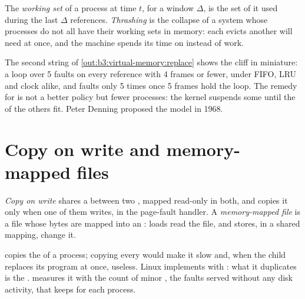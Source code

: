 \begin{definition}\label{def:b3:virtual-memory:working-set}
The \emph{working set} of a process at time $t$, for a window $\Delta$, is the set of  it used during the last $\Delta$ references. \emph{Thrashing} is the collapse of a system whose processes do not all have their working sets in memory: each evicts  another will need at once, and the machine spends its time on  instead of work.
\end{definition}

The second string of \cref{out:b3:virtual-memory:replace} shows the cliff in miniature: a loop over 5  faults on every reference with 4 frames or fewer, under FIFO, LRU and clock alike, and faults only 5 times once 5 frames hold the loop. The remedy for  is not a better policy but fewer processes: the kernel suspends some until the  of the others fit. Peter Denning proposed the  model in 1968. %

\section{Copy on write and memory-mapped files}\label{sec:b3:virtual-memory:cow}

\begin{definition}\label{def:b3:virtual-memory:cow}
\emph{Copy on write} shares a  between two , mapped read-only in both, and copies it only when one of them writes, in the page-fault handler. A \emph{memory-mapped file} is a file whose bytes are mapped into an : loads read the file, and stores, in a shared mapping, change it.
\end{definition}

 copies the  of a process; copying every  would make it slow and, when the child replaces its program at once, useless. Linux implements  with : what it duplicates is the . %
 measures it with the count of minor , the faults served without any disk activity, that  keeps for each process. %

